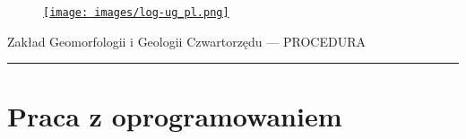 \documentclass[
  letterpaper,
  DIV=11,
  numbers=noendperiod]{scrreprt}
\begin{document}
\begin{figure}

\href{https://geomorfologia.ug.edu.pl}{\texttt{[image: images/log-ug\_pl.png]}}

\end{figure}

Zakład Geomorfologii i Geologii Czwartorzędu --- PROCEDURA

\begin{center}\rule{0.5\linewidth}{0.5pt}\end{center}

\hypertarget{praca-z-oprogramowaniem}{%
\section{Praca z oprogramowaniem}\label{praca-z-oprogramowaniem}}
\end{document}
